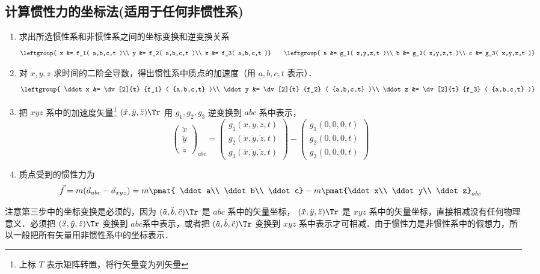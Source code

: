 \subsection{计算惯性力的坐标法(适用于任何非惯性系)}
\begin{enumerate}
\item 求出所选惯性系和非惯性系之间的坐标变换和逆变换关系
\begin{equation}
\leftgroup{
x &= f_1( a,b,c,t )\\
y &= f_2( a,b,c,t )\\
z &= f_3( a,b,c,t )}
\qquad
\leftgroup{
a &= g_1( x,y,z,t )\\
b &= g_2( x,y,z,t )\\
c &= g_3( x,y,z,t )}
\end{equation}
\item 对 $x,y,z$ 求时间的二阶全导数，得出惯性系中质点的加速度（用 $a,b,c,t$ 表示）．
\begin{equation}
\leftgroup{
\ddot x &= \dv[2]{t} {f_1} ( {a,b,c,t} )\\
\ddot y &= \dv[2]{t} {f_2} ( {a,b,c,t} )\\
\ddot z &= \dv[2]{t} {f_3} ( {a,b,c,t} )}
\end{equation}

\item 把 $xyz$ 系中的加速度矢量\footnote{上标 $T$ 表示矩阵转置，将行矢量变为列矢量} $({\ddot x},{\ddot y},{\ddot z})\Tr$ 用 $g_1,g_2,g_3$ 逆变换到 $abc$ 系中表示，
\begin{equation}
\begin{pmatrix} {\ddot x}\\{\ddot y}\\{\ddot z}\end{pmatrix}_{abc} = \begin{pmatrix} g_1(\ddot x,\ddot y,\ddot z, t)\\g_2(\ddot x,\ddot y,\ddot z, t)\\g_3(\ddot x,\ddot y,\ddot z, t)\end{pmatrix} -
\begin{pmatrix} g_1(0,0,0,t)\\g_2(0,0,0,t)\\g_3(0,0,0,t) \end{pmatrix}
\end{equation}

\item 质点受到的惯性力为
\begin{equation}\label{Iner_eq9}
\vec f = m ( \vec a_{abc} - \vec a_{xyz} ) = 
m\pmat{ \ddot a\\ \ddot b\\ \ddot c} - m\pmat{\ddot x\\ \ddot y\\ \ddot z}_{abc}
\end{equation}
\end{enumerate}
注意第三步中的坐标变换是必须的，因为 $({\ddot a},{\ddot b},{\ddot c})\Tr$ 是 $abc$ 系中的矢量坐标， $(\ddot x, \ddot y, \ddot z)\Tr$ 是 $xyz$ 系中的矢量坐标，直接相减没有任何物理意义．必须把 $(\ddot x, \ddot y, \ddot z)\Tr$ 变换到 $abc$系中表示，或者把 $(\ddot a, \ddot b, \ddot c)\Tr$ 变换到 $xyz$ 系中表示才可相减．由于惯性力是非惯性系中的假想力，所以一般把所有矢量用非惯性系中的坐标表示．


